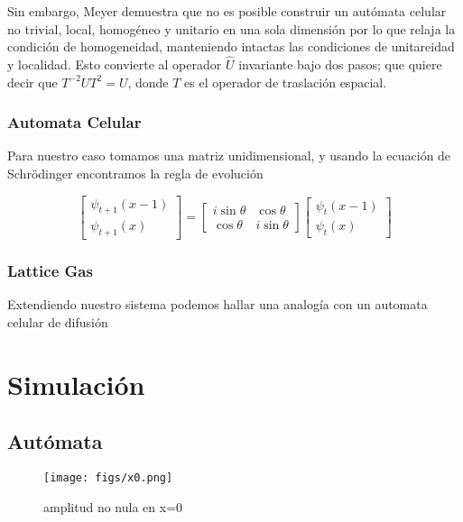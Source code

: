 \documentclass[12pts, letterpaper, twocolumn]{article}
\begin{document}
Sin embargo, Meyer demuestra que no es posible construir un autómata celular no trivial, 
local, homogéneo y unitario en una sola dimensión \cite{meyer}por lo que relaja la 
condición de homogeneidad, manteniendo intactas las condiciones de unitareidad y localidad.
Esto convierte al operador $\hat{U}$ invariante bajo dos pasos; que quiere decir que 
$T^{-2}UT^2=U$, donde $T$ es el operador de traslación espacial.

\subsubsection{Automata Celular}
 Para nuestro caso tomamos una matriz unidimensional, y usando la ecuación de Schrödinger 
 encontramos la regla de evolución \cite{meyer}

 \begin{equation}\label{eq:evolution}
    \left[ 
    \begin{matrix}
        \psi_{t+1}(x-1) \\
        \psi_{t+1}(x)
    \end{matrix}
    \right] = 
    \begin{bmatrix}
        i\sin\theta & \cos\theta \\
        \cos\theta & i\sin\theta
    \end{bmatrix}
    \left[ 
    \begin{matrix}
        \psi_{t}(x-1) \\
        \psi_{t}(x)
    \end{matrix}
    \right]
\end{equation}
\subsubsection{Lattice Gas}
Extendiendo nuestro sistema podemos hallar una analogía con un automata celular de difusión



\section{Simulación}
\subsection{Autómata}

\begin{figure*}[h]
    \centering
    \texttt{[image: figs/x0.png]}
    \caption{amplitud no nula en x=0}
    \label{fig:x0}
\end{figure*}
\end{document}

